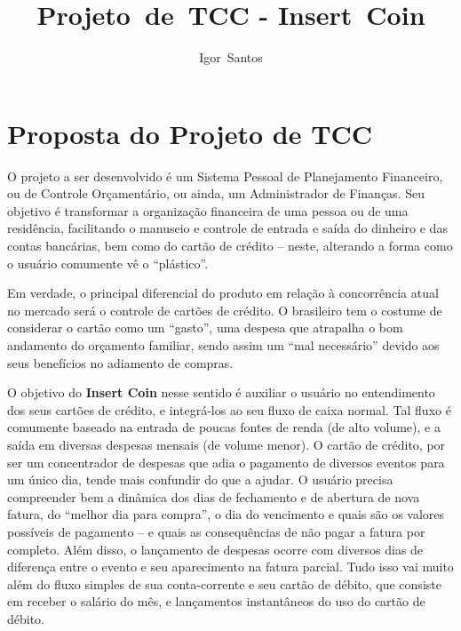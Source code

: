 \documentclass[a4paper,article]{abnt}
\author{Igor~Santos}
\title{Projeto~de~TCC - Insert~Coin}
\begin{document}
\maketitle


\tableofcontents

\chapter{Proposta do Projeto de TCC}

O projeto a ser desenvolvido é um Sistema Pessoal de Planejamento Financeiro, ou de Controle Orçamentário, ou ainda, um Administrador de
Finanças. Seu objetivo é transformar a organização financeira de uma pessoa ou de uma residência, facilitando o manuseio e controle de entrada e saída do dinheiro e das contas bancárias, bem como do cartão de crédito – neste, alterando a forma como o usuário comumente vê o ``plástico''.

Em verdade, o principal diferencial do produto em relação à concorrência atual no mercado será o controle de cartões de crédito. O brasileiro tem o costume de considerar o cartão como um ``gasto'', uma despesa que atrapalha o bom andamento do orçamento familiar, sendo assim um ``mal necessário'' devido aos seus benefícios no adiamento de compras.

O objetivo do \textbf{Insert Coin} nesse sentido é auxiliar o usuário no entendimento dos seus cartões de crédito, e integrá-los ao seu fluxo de caixa normal. Tal fluxo é comumente baseado na entrada de poucas fontes de renda (de alto volume), e a saída em diversas despesas mensais (de volume menor). O cartão de crédito, por ser um concentrador de despesas que adia o pagamento de diversos eventos para um único dia, tende mais confundir do que a ajudar. O usuário precisa compreender bem a dinâmica dos dias de fechamento e de abertura de nova fatura, do ``melhor dia para compra'', o dia do vencimento e quais são os valores possíveis de pagamento – e quais as consequências de não pagar a fatura por completo. Além disso, o lançamento de despesas ocorre com diversos dias de diferença entre o evento e seu aparecimento na fatura parcial. Tudo isso vai muito além do fluxo simples de sua conta-corrente e seu cartão de débito, que consiste em receber o salário do mês, e lançamentos instantâneos do uso do cartão de débito.

\end{document}
